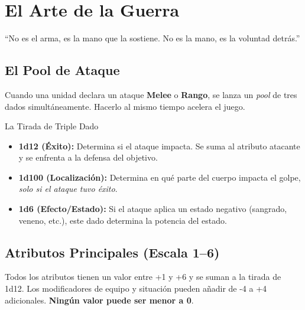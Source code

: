 
\chapter{El Arte de la Guerra}

\begin{loreblock}
``No es el arma, es la mano que la sostiene. No es la mano, es la voluntad detrás.''
\end{loreblock}

\vspace{0.4cm}

\section{El Pool de Ataque}

Cuando una unidad declara un ataque \textbf{Melee} o \textbf{Rango}, se lanza un \textit{pool} de tres dados simultáneamente. Hacerlo al mismo tiempo acelera el juego.

\begin{reglaespecial}{La Tirada de Triple Dado}
\begin{itemize}
    \item \textbf{1d12 (Éxito):} Determina si el ataque impacta. Se suma al atributo atacante y se enfrenta a la defensa del objetivo.
    \item \textbf{1d100 (Localización):} Determina en qué parte del cuerpo impacta el golpe, \textit{solo si el ataque tuvo éxito}.
    \item \textbf{1d6 (Efecto/Estado):} Si el ataque aplica un estado negativo (sangrado, veneno, etc.), este dado determina la potencia del estado.
\end{itemize}
\end{reglaespecial}

\section{Atributos Principales (Escala 1--6)}

Todos los atributos tienen un valor entre +1 y +6 y se suman a la tirada de 1d12. Los modificadores de equipo y situación pueden añadir de -4 a +4 adicionales. \textbf{Ningún valor puede ser menor a 0}.

